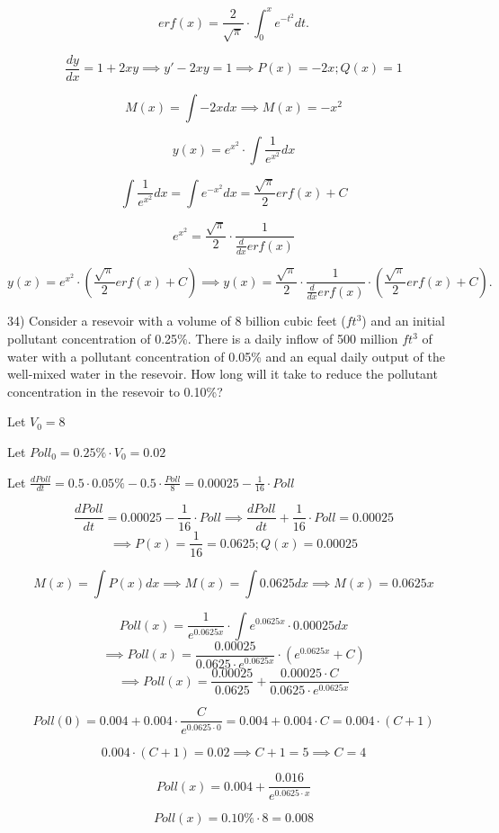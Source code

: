 \documentclass{article}
\begin{document}
\[erf(x) = \frac{2}{\sqrt{\pi}} \cdot \int_{0}^{x} e^{-t^2} dt.\]

\[\frac{dy}{dx} = 1 + 2xy
\implies y' - 2xy = 1
\implies P(x) = -2x; Q(x) = 1\]

\[M(x) = \int -2x dx
\implies M(x) = -x^2\]

\[y(x) = e^{x^2} \cdot \int \frac{1}{e^{x^2}} dx\]

\[\int \frac{1}{e^{x^2}} dx
= \int e^{-x^2} dx
= \frac{\sqrt{\pi}}{2} erf(x) + C\]

\[e^{x^2} = \frac{\sqrt{\pi}}{2} \cdot \frac{1}{\frac{d}{dx} erf(x)}\]

\[y(x) = e^{x^2} \cdot (\frac{\sqrt{\pi}}{2} erf(x) + C)
\implies y(x) = \frac{\sqrt{\pi}}{2} \cdot \frac{1}{\frac{d}{dx} erf(x)} \cdot (\frac{\sqrt{\pi}}{2} erf(x) + C).\]


34) Consider a resevoir with a volume of 8 billion cubic feet ($ft^3$)
and an initial pollutant concentration of 0.25\%. There is a daily
inflow of 500 million $ft^3$ of water with a pollutant
concentration of 0.05\% and an equal daily output of the well-mixed
water in the resevoir. How long will it take to reduce the pollutant
concentration in the resevoir to 0.10\%?

Let $V_0 = 8$

Let $Poll_0 = 0.25\% \cdot V_0 = 0.02$

Let $\frac{dPoll}{dt} = 0.5 \cdot 0.05\% - 0.5 \cdot \frac{Poll}{8}
= 0.00025 - \frac{1}{16} \cdot Poll$

\[\frac{dPoll}{dt} = 0.00025 - \frac{1}{16} \cdot Poll
\implies \frac{dPoll}{dt} + \frac{1}{16} \cdot Poll = 0.00025\]
\[\implies P(x) = \frac{1}{16} = 0.0625; Q(x) = 0.00025\]

\[M(x) = \int P(x) dx
\implies M(x) = \int 0.0625 dx
\implies M(x) = 0.0625x\]

\[Poll(x) = \frac{1}{e^{0.0625x}} \cdot \int e^{0.0625x} \cdot 0.00025 dx\]
\[\implies Poll(x) = \frac{0.00025}{0.0625 \cdot e^{0.0625x}} \cdot (e^{0.0625x} + C)\]
\[\implies Poll(x) = \frac{0.00025}{0.0625} + \frac{0.00025 \cdot C}{0.0625 \cdot e^{0.0625x}}\]

\[Poll(0) = 0.004 + 0.004 \cdot \frac{C}{e^{0.0625 \cdot 0}}
= 0.004 + 0.004 \cdot C
= 0.004 \cdot (C + 1)\]

\[0.004 \cdot (C + 1) = 0.02
\implies C + 1 = 5
\implies C = 4\]

\[Poll(x) = 0.004 + \frac{0.016}{e^{0.0625 \cdot x}}\]

\[Poll(x) = 0.10\% \cdot 8 = 0.008\]
\end{document}
